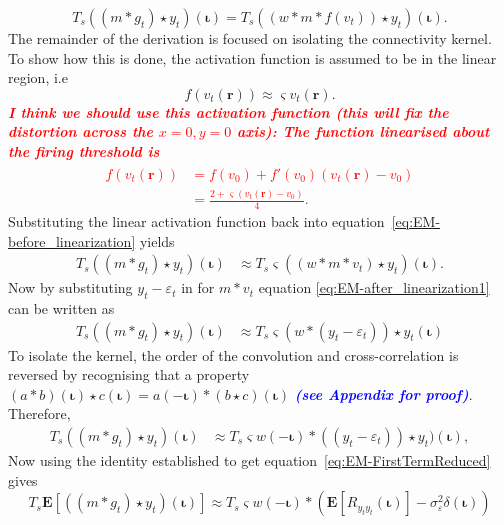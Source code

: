 \documentclass[]{article}
\newcommand{\dean}[1]{\textsf{\emph{\textbf{\textcolor{red}{#1}}}}}
\newcommand{\parham}[1]{\textsf{\emph{\textbf{\textcolor{blue}{#1}}}}}
\begin{document}
\begin{equation}\label{eq:EM-before_linearization}
	T_s((m \ast g_t) \star y_t)(\boldsymbol\iota) = T_s((w \ast m\ast f(v_t)) \star y_t)(\boldsymbol\iota).
\end{equation}
The remainder of the derivation is focused on isolating the connectivity kernel. To show how this is done, the activation function is assumed to be in the linear region, i.e 
 \begin{equation}
	f\left(v_t(\mathbf{r})\right) \approx \varsigma v_t(\mathbf{r}).
\end{equation} 
\dean{I think we should use this activation function (this will fix the distortion across the $x=0,y=0$ axis):
The function linearised about the firing threshold is 
\begin{align}
	\hat{f}(v_t\left(\mathbf{r}\right)) &= f(v_0) + f'(v_0)(v_t\left(\mathbf{r}\right) - v_0) \\
	&= \frac{2 + \varsigma(v_t\left(\mathbf{r}\right) - v_0)}{4}. \label{eq:LinearActivationFunction} 
\end{align}}
Substituting the linear activation function back into equation~\eqref{eq:EM-before_linearization} yields
\begin{align}\label{eq:EM-after_linearization1}	
	T_s((m \ast g_t) \star y_t)(\boldsymbol\iota) &\approx T_s\varsigma((w \ast m\ast v_t) \star y_t)(\boldsymbol\iota).
\end{align}
Now by substituting $y_t - \varepsilon_t$ in for $m\ast v_t$ equation \eqref{eq:EM-after_linearization1} can be written as 
\begin{align}
	T_s((m \ast g_t) \star y_t)(\boldsymbol\iota) &\approx T_s\varsigma(w\ast (y_t - \varepsilon_t)) \star y_t (\boldsymbol\iota)
\end{align}
To isolate the kernel, the order of the convolution and cross-correlation is reversed by recognising that a property $(a \ast b)(\boldsymbol\iota) \star c(\boldsymbol\iota) = a(-\boldsymbol\iota)\ast(b \star c)(\boldsymbol\iota)$ \parham{(see Appendix for proof)}. Therefore,
\begin{align}
	T_s((m \ast g_t) \star y_t)(\boldsymbol\iota) &\approx T_s\varsigma w(-\boldsymbol\iota) \ast ((y_t - \varepsilon_t)) \star y_t)(\boldsymbol\iota),
\end{align}
Now using the identity established to get equation~\eqref{eq:EM-FirstTermReduced} gives
\begin{equation}\label{eq:EM-second_term_reduced}
	T_s\mathbf{E}\left[((m \ast g_t) \star y_t)(\boldsymbol\iota)\right] \approx T_s\varsigma w(-\boldsymbol\iota) \ast  (\mathbf{E}\left[R_{y_ty_t}(\boldsymbol\iota)\right] - \sigma_{\varepsilon}^2 \delta(\boldsymbol\iota))
\end{equation}
\end{document}
